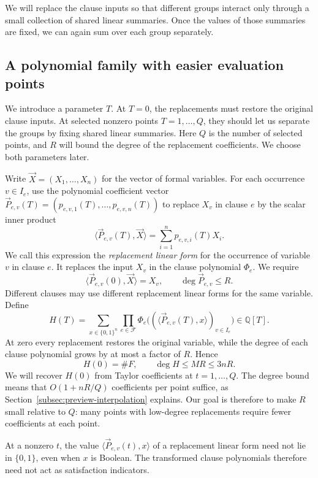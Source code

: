 \documentclass[11pt,reqno]{amsart}
\numberwithin{equation}{section}
\theoremstyle{definition}\newtheorem{definition}[theorem]{Definition}
\theoremstyle{remark}\newtheorem{remark}[theorem]{Remark}
\renewcommand{\le}{\leqslant}
\begin{document}
We will replace the clause inputs so that different groups interact
only through a small collection of shared linear summaries. Once
the values of those summaries are fixed, we can again sum over
each group separately.

\subsection{A polynomial family with easier evaluation points}
\label{subsec:preview-deformation}
We introduce a parameter $T$. At $T=0$, the replacements must
restore the original clause inputs. At selected nonzero points
$T=1,\ldots,Q$, they should let us separate the groups by fixing
shared linear summaries. Here $Q$ is the number of selected points,
and $R$ will bound the degree of the replacement coefficients.
We choose both parameters later.

Write $\vec{X}=(X_1,\ldots,X_n)$ for the vector of formal variables.
For each occurrence $v\in I_e$, use the polynomial coefficient vector
$\vec{P}_{e,v}(T)=(p_{e,v,1}(T),\ldots,p_{e,v,n}(T))$ to replace
$X_v$ in clause $e$ by the scalar inner product
\[
 \langle \vec{P}_{e,v}(T),\vec{X}\rangle
 =\sum_{i=1}^n p_{e,v,i}(T)X_i.
\]
We call this expression the \emph{replacement linear form} for
the occurrence of variable $v$ in clause $e$. It replaces the
input $X_v$ in the clause polynomial $\Phi_e$.
We require
\[
 \langle \vec{P}_{e,v}(0),\vec{X}\rangle=X_v,
 \qquad \deg \vec{P}_{e,v}\le R.
\]
Different clauses may use different replacement linear forms
for the same variable.
Define
\begin{equation}\label{eq:simple-counting-polynomial}
 H(T)=\sum_{x\in\{0,1\}^n}\prod_{e\in\mathcal F}
       \Phi_e\bigl((\langle \vec{P}_{e,v}(T), x\rangle)_{v\in I_e}\bigr)
       \in\mathbb Q[T].
\end{equation}
At zero every replacement restores the original variable, while
the degree of each clause polynomial grows by at most a factor of $R$. Hence
\begin{equation}\label{eq:overview-value-degree}
 H(0)=\#F,\qquad \deg H\le MR\le3nR.
\end{equation}
We will recover $H(0)$ from Taylor coefficients at $t=1,\ldots,Q$.
The degree bound means that $O(1+nR/Q)$ coefficients per point
suffice, as Section~\ref{subsec:preview-interpolation} explains.
Our goal is therefore to make $R$ small relative to $Q$: many
points with low-degree replacements require fewer coefficients
at each point.

At a nonzero $t$, the value $\langle\vec{P}_{e,v}(t),x\rangle$
of a replacement linear form need not lie in $\{0,1\}$, even
when $x$ is Boolean. The transformed clause polynomials
therefore need not act as satisfaction indicators.
\end{document}
